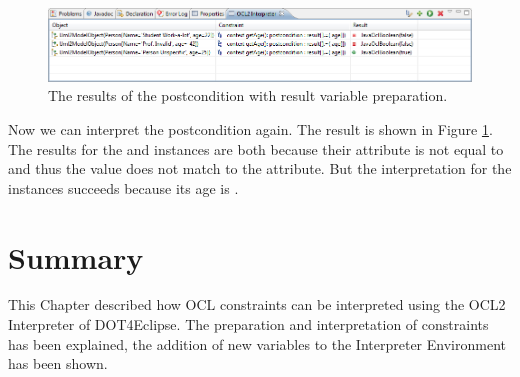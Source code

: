 \begin{figure}[!htbp]
	\centering
	\includegraphics[width=1.0\linewidth]{figures/interpreter/interpret10}
	\caption{The results of the postcondition with result variable preparation.}
	\label{pic:interpret:interpret10}
\end{figure}

Now we can interpret the postcondition again. The result is shown in Figure \ref{pic:interpret:interpret10}. The results for the  and  instances are both  because their  attribute is not equal to  and thus the  value does not match to the  attribute. But the interpretation for the  instances succeeds because its age is .




\section{Summary}
  
This Chapter described how \acs{OCL} constraints can be interpreted using the \acs{OCL}2 Interpreter of \acl{DOT4Eclipse}. The preparation and interpretation of constraints has been explained, the addition of new variables to the Interpreter Environment has been shown.
